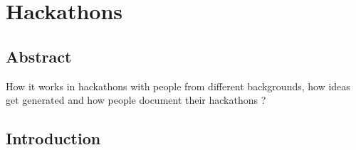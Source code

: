 \chapter{Hackathons}
\theoremstyle{plain}
\theoremsymbol{}
\newtheorem{Rule}[theorem]{Rule}

\begin{comment}

\section{Abstract}

\section{Introduction}

\section{Methodology (what you did/used)}

\section{RESULTS (what you found/saw)}

\section{DISCUSSION/CONCLUSION}

\renewcommand{\labelenumii}{\Roman{enumii}}
\begin{enumerate}

	\item  

\end{enumerate}
\end{comment}


\section{Abstract}
How it works in hackathons with people from different backgrounds, how ideas get generated and how people document their hackathons ?
\section{Introduction}

